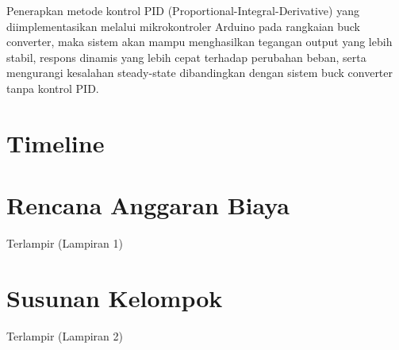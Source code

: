 Penerapkan metode kontrol PID (Proportional-Integral-Derivative) yang diimplementasikan melalui mikrokontroler Arduino pada rangkaian buck converter, maka sistem akan mampu menghasilkan tegangan output yang lebih stabil, respons dinamis yang lebih cepat terhadap perubahan beban, serta mengurangi kesalahan steady-state dibandingkan dengan sistem buck converter tanpa kontrol PID.
\section{Timeline}
\section{Rencana Anggaran Biaya}
Terlampir (Lampiran 1) 

\section{Susunan Kelompok}
Terlampir (Lampiran 2)

